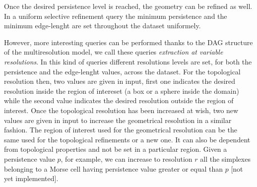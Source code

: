 \documentclass[preprint,5p,times,onecolumn]{article}
\begin{document}
Once the desired persistence level is reached, the geometry can be refined as well. In a uniform selective refinement query the minimum persistence and the minimum edge-lenght are set throughout the dataset uniformely.

However, more interesting queries can be performed thanks to the DAG structure of the multiresolution model, we call these queries {\em extraction at variable resolutions}. In this kind of queries different resolutions levels are set, for both the persistence and the edge-lenght values, across the dataset.
For the topological resolution then, two values are given in input, first one indicates the desired resolution inside the region of intereset (a box or a sphere inside the domain) while the second value indicates the desired resolution outside the region of interest. Once the topological resolution has been increased at wish, two new values are given in input to increase the geometrical resolution in a similar fashion.
The region of interest used for the geometrical resolution can be the same used for the topological refinements or a new one. It can also be dependent from topological properties and not be set in a particular region. Given a persistence value $p$, for example, we can increase to resolution $r$ all the simplexes belonging to a Morse cell having persistence value greater or equal than $p$ [not yet implemented].





\end{document}

